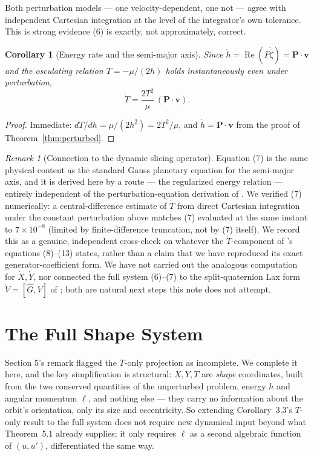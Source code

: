 \documentclass[12pt]{amsart}
\theoremstyle{plain}
\newtheorem{corollary}[theorem]{Corollary}
\theoremstyle{remark}
\newtheorem*{remark}{Remark}
\begin{document}
Both perturbation models --- one velocity-dependent, one not --- agree with independent Cartesian integration at the level of the integrator's own tolerance. This is strong evidence (6) is exactly, not approximately, correct.

\begin{corollary}[Energy rate and the semi-major axis]\label{cor:Tdot}
Since $\dot h=\operatorname{Re}(P\dot{\bar\zeta})=\mathbf P\cdot\mathbf v$ and the osculating relation $T=-\mu/(2h)$ holds instantaneously even under perturbation,
\begin{equation}
\dot T = \frac{2T^2}{\mu}\,(\mathbf P\cdot\mathbf v). \tag{7}
\end{equation}
\end{corollary}

\begin{proof}
Immediate: $dT/dh=\mu/(2h^2)=2T^2/\mu$, and $\dot h=\mathbf P\cdot\mathbf v$ from the proof of Theorem~\ref{thm:perturbed}. \qedhere
\end{proof}

\begin{remark}[Connection to the dynamic slicing operator]
Equation (7) is the same physical content as the standard Gauss planetary equation for the semi-major axis, and it is derived here by a route --- the regularized energy relation --- entirely independent of the perturbation-equation derivation of \cite{Ebert2026Cone}. We verified (7) numerically: a central-difference estimate of $\dot T$ from direct Cartesian integration under the constant perturbation above matches (7) evaluated at the same instant to $7\times10^{-8}$ (limited by finite-difference truncation, not by (7) itself). We record this as a genuine, independent cross-check on whatever the $\dot T$-component of \cite{Ebert2026Cone}'s equations (8)--(13) states, rather than a claim that we have reproduced its exact generator-coefficient form. We have not carried out the analogous computation for $\dot X,\dot Y$, nor connected the full system (6)--(7) to the split-quaternion Lax form $\dot V=[\hat G,V]$ of \cite{Ebert2026Clock}; both are natural next steps this note does not attempt.
\end{remark}

\section{The Full Shape System}

Section 5's remark flagged the $T$-only projection as incomplete. We complete it here, and the key simplification is structural: $X,Y,T$ are \emph{shape} coordinates, built from the two conserved quantities of the unperturbed problem, energy $h$ and angular momentum $\ell$, and nothing else --- they carry no information about the orbit's orientation, only its size and eccentricity. So extending Corollary~3.3's $T$-only result to the full system does not require new dynamical input beyond what Theorem~5.1 already supplies; it only requires $\ell$ as a second algebraic function of $(u,u')$, differentiated the same way.
\end{document}
